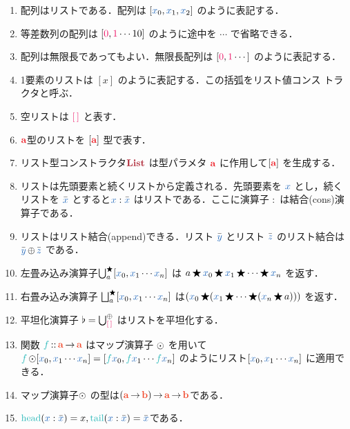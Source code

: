 \documentclass[a5paper,twoside,fleqn,draft]{jsbook}
\begin{document}
\begin{enumerate}
\item 配列はリストである．配列は $[\hVar{x}_0,\hVar{x}_1,\hVar{x}_2]$ のように表記する．
\item 等差数列の配列は $[\hConstant{0},\hConstant{1}\dotsb10]$ のように途中を $\dotsb$ で省略できる．
\item 配列は無限長であってもよい．無限長配列は $[\hConstant{0},\hConstant{1}\dotsb]$ のように表記する．
\item 1要素のリストは $[x]$ のように表記する．この括弧をリスト値コンス
  トラクタと呼ぶ．
\item 空リストは $\mEmptyList$ と表す．
\item $\hTypeName{a}$型のリストを $\hListConstruct{\hTypeName{a}}$ 型で表す．
\item リスト型コンストラクタ$\mListTypeConstructor$ は型パラメタ $\hTypeName{a}$ に作用して$\hListConstruct{\hTypeName{a}}$ を生成する．
\item リストは先頭要素と続くリストから定義される．先頭要素を $\hVar{x}$ とし，続くリストを $\hListVarWith{x}$ とすると$\hVar{x}:\hListVarWith{x}$ はリストである．ここに演算子 $:$ は結合(cons)演算子である．
\item リストはリスト結合(append)できる．リスト $\hListVarWith{y}$ とリスト $\hListVarWith{z}$ のリスト結合は $\hListVarWith{y}\hAppend\hListVarWith{z}$ である．
\item 左畳み込み演算子$\mFold^{\hAnyBinOp}_a[\hVar{x}_0,\hVar{x}_1\dotsb \hVar{x}_n]$ は $a\hAnyBinOp \hVar{x}_0\hAnyBinOp \hVar{x}_1\hAnyBinOp\dotsb\hAnyBinOp \hVar{x}_n$ を返す．
\item 右畳み込み演算子 $\mFoldRight^{\hAnyBinOp}_{a}[\hVar{x}_0,\hVar{x}_1\dotsb \hVar{x}_n]$ は$(\hVar{x}_0\hAnyBinOp(\hVar{x}_1\hAnyBinOp\dotsb\hAnyBinOp(\hVar{x}_n\hAnyBinOp a)))$ を返す．
\item 平坦化演算子 $\mJoinList=\mFold_\mEmptyList^{\hAppend}$ はリストを平坦化する．
\item 関数 $\hFunc{f}\hIsTypeOf\mProjEXP{\mA }{\mA }$ はマップ演算子 $\operatorname{\odot}$ を用いて $\hFunc{f}\mMapList[\hVar{x}_0,\hVar{x}_1\dotsb \hVar{x}_n]=[\hFunc{f}\hVar{x}_0,\hFunc{f}\hVar{x}_1\dotsb \hFunc{f}\hVar{x}_n]$ のようにリスト$[\hVar{x}_0,\hVar{x}_1\dotsb \hVar{x}_n]$ に適用できる．
\item マップ演算子$\operatorname{\odot}$ の型は$\mProjEXP{(\mProjEXP{\mA }{\mB})}{\mProjEXP{\mA }{\mB }}$である．
\item $\mHead(\hVar{x}:\hListVarWith{x})=x,\mTail(\hVar{x}:\hListVarWith{x})=\hListVarWith{x}$である．
\end{enumerate}
\end{document}
